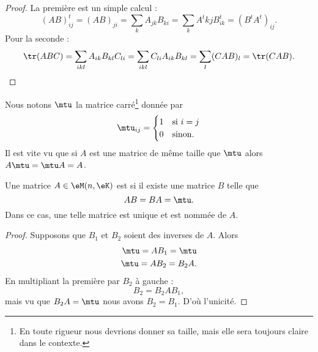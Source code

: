 \begin{proof}
    La première est un simple calcul :
    \begin{equation}
        (AB)^t_{ij}=(AB)_{ji}=\sum_kA_{jk}B_{ki}=\sum_kA^tkjB^t_{ik}=(B^tA^t)_{ij}.
    \end{equation}
    Pour la seconde :
    \begin{equation}
        \tr(ABC)=\sum_{ikl}A_{ik}B_{kl}C_{li}=\sum_{ikl}C_{li}A_{ik}B_{kl}=\sum_l(CAB)_l=\tr(CAB).
    \end{equation}
\end{proof}

Nous notons \( \mtu\) la matrice carré\footnote{En toute rigueur nous devrions donner sa taille, mais elle sera toujours claire dans le contexte.} donnée par
\begin{equation}
    \mtu_{ij}=\begin{cases}
        1    &   \text{si } i=j\\
        0    &    \text{sinon.}
    \end{cases}
\end{equation}
Il est vite vu que si \( A\) est une matrice de même taille que \( \mtu\) alors \( A\mtu=\mtu A=A\).

\begin{propositionDef}
    Une matrice \( A\in \eM(n,\eK)\) est  si il existe une matrice \( B\) telle que
    \begin{equation}
        AB=BA=\mtu.
    \end{equation}
    Dans ce cas, une telle matrice est unique et est nommée  de \( A\).
\end{propositionDef}

\begin{proof}
    Supposons que \( B_1\) et \( B_2\) soient des inverses de \( A\). Alors
    \begin{subequations}
        \begin{align}
            \mtu=AB_1=\mtu\\
            \mtu=AB_2=B_2A.
        \end{align}
    \end{subequations}
    En multipliant la première par \( B_2\) à gauche :
    \begin{equation}
        B_2=B_2AB_1,
    \end{equation}
    mais vu que \( B_2A=\mtu\) nous avons \( B_2=B_1\). D'où l'unicité.
\end{proof}

